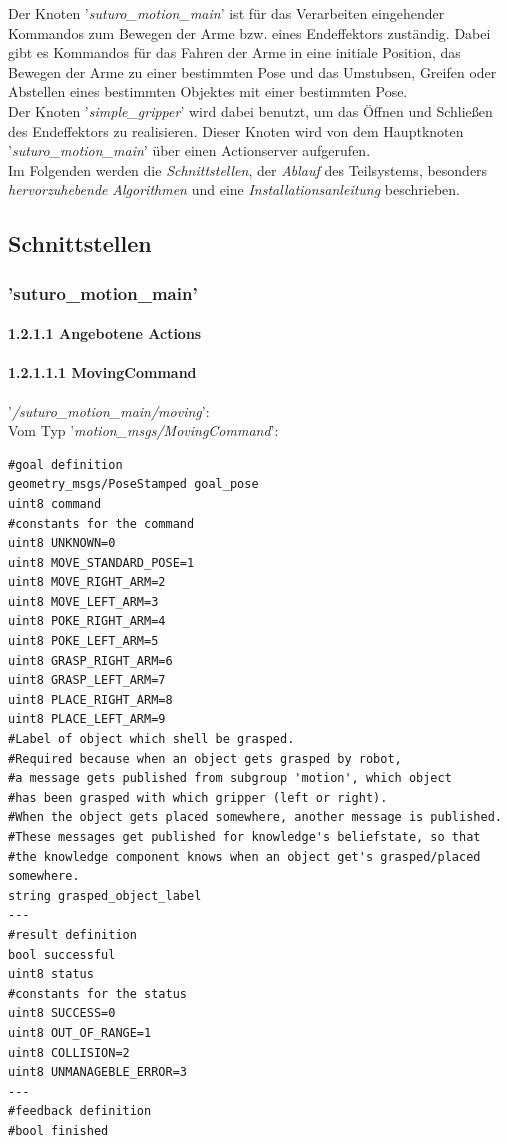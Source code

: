\documentclass{suturo}
\begin{document}
Der Knoten '\textit{suturo\_motion\_main}' ist für das Verarbeiten eingehender Kommandos zum Bewegen der Arme bzw. eines Endeffektors zuständig. Dabei gibt es Kommandos für das Fahren der Arme in eine initiale Position, das Bewegen der Arme zu einer bestimmten Pose und das Umstubsen, Greifen oder Abstellen eines bestimmten Objektes mit einer bestimmten Pose.\\
Der Knoten '\textit{simple\_gripper}' wird dabei benutzt, um das Öffnen und Schließen des Endeffektors zu realisieren. Dieser Knoten wird von dem Hauptknoten '\textit{suturo\_motion\_main}' über einen Actionserver aufgerufen.\\

Im Folgenden werden die \textit{Schnittstellen}, der \textit{Ablauf} des Teilsystems, besonders \textit{hervorzuhebende} \textit{Algorithmen} und eine \textit{Installationsanleitung} beschrieben.\\

\subsection{Schnittstellen}
\subsubsection{'suturo\_motion\_main'}

\paragraph{1.2.1.1 Angebotene Actions}

\paragraph{1.2.1.1.1 MovingCommand}
'\textit{/suturo\_motion\_main/moving}': \\
Vom Typ '\textit{motion\_msgs/MovingCommand}': \\
\begin{lstlisting}[caption={Definition des MovingCommands},captionpos=b]
#goal definition
geometry_msgs/PoseStamped goal_pose
uint8 command
#constants for the command
uint8 UNKNOWN=0
uint8 MOVE_STANDARD_POSE=1
uint8 MOVE_RIGHT_ARM=2
uint8 MOVE_LEFT_ARM=3
uint8 POKE_RIGHT_ARM=4
uint8 POKE_LEFT_ARM=5
uint8 GRASP_RIGHT_ARM=6
uint8 GRASP_LEFT_ARM=7
uint8 PLACE_RIGHT_ARM=8
uint8 PLACE_LEFT_ARM=9
#Label of object which shell be grasped.
#Required because when an object gets grasped by robot,
#a message gets published from subgroup 'motion', which object
#has been grasped with which gripper (left or right).
#When the object gets placed somewhere, another message is published.
#These messages get published for knowledge's beliefstate, so that
#the knowledge component knows when an object get's grasped/placed somewhere.
string grasped_object_label
---
#result definition
bool successful
uint8 status
#constants for the status
uint8 SUCCESS=0
uint8 OUT_OF_RANGE=1
uint8 COLLISION=2
uint8 UNMANAGEBLE_ERROR=3
---
#feedback definition
#bool finished
\end{lstlisting}
\end{document}
